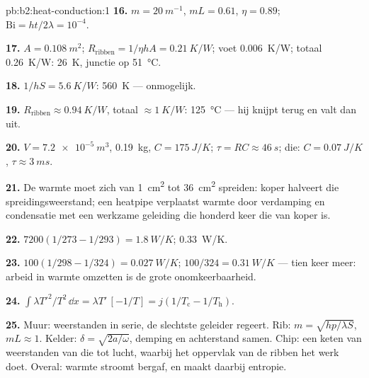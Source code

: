 \begin{solution}{pb:b2:heat-conduction:1}
\textbf{16.} $m = \qty{20}{m^{-1}}$, $mL = 0.61$, $\eta = 0.89$;
$\mathrm{Bi} = ht/2\lambda
= 10^{-4}$.

\textbf{17.} $A = \qty{0.108}{m^2}$;
$R_{\text{ribben}} = 1/\eta hA = \qty{0.21}{K/W}$; voet
\qty{0.006}{K/W}; totaal \qty{0.26}{K/W}: \qty{26}{K}, junctie op
\qty{51}{\celsius}.

\textbf{18.} $1/hS = \qty{5.6}{K/W}$: \qty{560}{K} --- onmogelijk.

\textbf{19.} $R_{\text{ribben}} \approx \qty{0.94}{K/W}$, totaal
$\approx \qty{1}{K/W}$:
\qty{125}{\celsius} --- hij knijpt terug en valt dan uit.

\textbf{20.} $V = \qty{7.2e-5}{m^3}$, \qty{0.19}{kg}, $C = \qty{175}{J/K}$;
$\tau = RC
\approx \qty{46}{s}$; die: $C = \qty{0.07}{J/K}$,
$\tau \approx \qty{3}{ms}$.

\textbf{21.} De warmte moet zich van \qty{1}{cm^2} tot \qty{36}{cm^2}
spreiden: koper
halveert die spreidingsweerstand; een heatpipe verplaatst warmte door
verdamping en condensatie met een werkzame geleiding die honderd
keer die van koper is.

\textbf{22.} $7200(1/273 - 1/293) = \qty{1.8}{W/K}$; \qty{0.33}{W/K}.

\textbf{23.} $100(1/298 - 1/324) = \qty{0.027}{W/K}$;
$100/324 = \qty{0.31}{W/K}$ ---
tien keer meer: arbeid in warmte omzetten is de grote onomkeerbaarheid.

\textbf{24.}
$\int\lambda T'^2/T^2\,\dd x = \lambda T'\,[-1/T] = j(1/T_{\text{c}} -
1/T_{\text{h}})$.

\textbf{25.} Muur: weerstanden in serie, de slechtste geleider regeert.
Rib: $m = \sqrt{hp/\lambda S}$, $mL \approx 1$. Kelder: $\delta = \sqrt{2a/\omega}$,
demping en achterstand samen. Chip: een keten van weerstanden van die tot
lucht, waarbij het oppervlak van de ribben het werk doet. Overal: warmte
stroomt bergaf, en
maakt daarbij entropie.
\end{solution}
